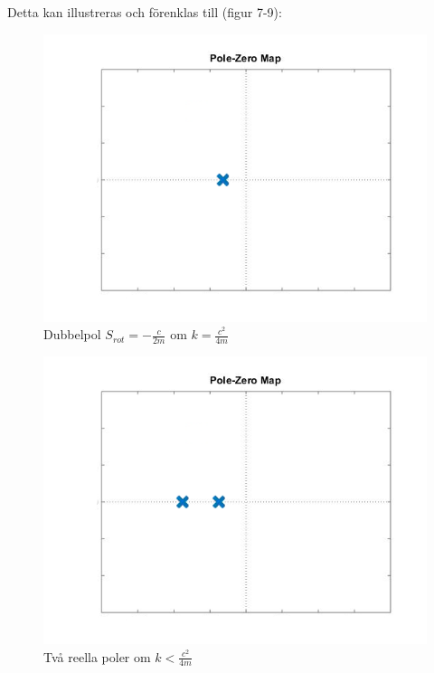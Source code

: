 \documentclass[10pt,a4paper]{article}
\begin{document}
Detta kan illustreras och förenklas till (figur 7-9):

\begin{figure}
\begin{center}
\includegraphics[scale=0.3]{1reell}
\caption{Dubbelpol $S_{rot}=-\frac{c}{2m}$ om $k=\frac{c^2}{4m}$}
\end{center}
\end{figure}

\begin{figure}
\begin{center}
\includegraphics[scale=0.3]{2reella}
\caption{Två reella poler om $k<\frac{c^2}{4m}$}
\end{center}
\end{figure}
\end{document}
